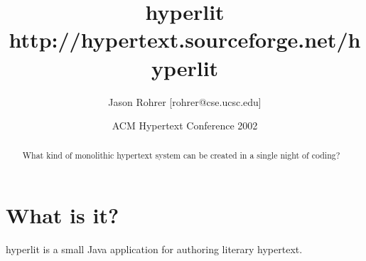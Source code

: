 \documentclass[12pt]{article}
\begin{document}
\newcommand{\http}{{\sc http}}
\newcommand{\url}{{\sc url}}


\newcommand{\insertfigure}[4] {
	\begin{figure}[tb]
		\begin{center}
			\fbox{
				\begin{minipage}{#1}
					\texttt{[image: \#2]}
				
					\caption{#3}
				
					\label{#4}
				\end{minipage}
			} 
		\end{center}
	\end{figure}
}

\newlength{\oldUnitLength}

\newcommand{\insertpicture}[5] {
	\begin{figure}[tb]
		\begin{center}
			\fbox{
				\begin{minipage}{#1}
                    \begin{pspicture*}(0,0)(\textwidth, #2\textwidth)
                    \psset{xunit=\textwidth}
                    \psset{yunit=\textwidth}
                    \psset{runit=\textwidth}                 
                        #5
                    \end{pspicture*}
					\caption{#3}
				
					\label{#4}
				\end{minipage}
			} 
		\end{center}
	\end{figure}
}






\author{Jason Rohrer [rohrer@cse.ucsc.edu]}
\date{ACM Hypertext Conference 2002}
\title{hyperlit\\ http://hypertext.sourceforge.net/hyperlit}


\maketitle


\begin{abstract}
What kind of monolithic hypertext system can be created in a single night of coding?
\end{abstract}


\section{What is it?}
hyperlit is a small Java application for authoring literary hypertext.
\end{document}
